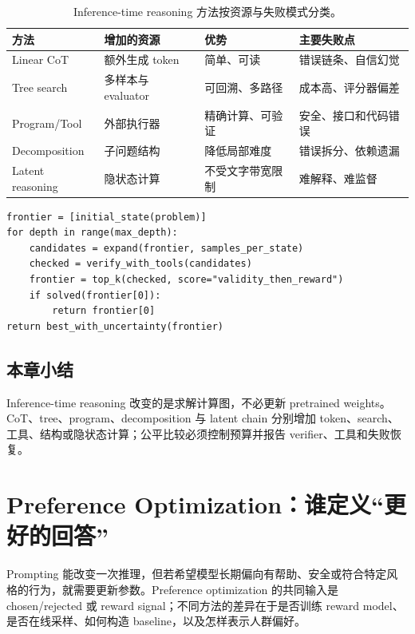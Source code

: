 \documentclass[a4paper]{article}
\begin{document}
\begin{table}[H]
\centering
\small
\begin{tabularx}{\textwidth}{L{0.18\textwidth} X X X}
\toprule
方法 & 增加的资源 & 优势 & 主要失败点 \\
\midrule
Linear CoT & 额外生成 token & 简单、可读 & 错误链条、自信幻觉 \\
Tree search & 多样本与 evaluator & 可回溯、多路径 & 成本高、评分器偏差 \\
Program/Tool & 外部执行器 & 精确计算、可验证 & 安全、接口和代码错误 \\
Decomposition & 子问题结构 & 降低局部难度 & 错误拆分、依赖遗漏 \\
Latent reasoning & 隐状态计算 & 不受文字带宽限制 & 难解释、难监督 \\
\bottomrule
\end{tabularx}
\caption{Inference-time reasoning 方法按资源与失败模式分类。}
\end{table}

\begin{lstlisting}[caption={预算受限的 reasoning search 伪代码}]
frontier = [initial_state(problem)]
for depth in range(max_depth):
    candidates = expand(frontier, samples_per_state)
    checked = verify_with_tools(candidates)
    frontier = top_k(checked, score="validity_then_reward")
    if solved(frontier[0]):
        return frontier[0]
return best_with_uncertainty(frontier)
\end{lstlisting}

\subsection{本章小结}

Inference-time reasoning 改变的是求解计算图，不必更新 pretrained weights。CoT、tree、program、decomposition 与 latent chain 分别增加 token、search、工具、结构或隐状态计算；公平比较必须控制预算并报告 verifier、工具和失败恢复。

\section{Preference Optimization：谁定义“更好的回答”}

Prompting 能改变一次推理，但若希望模型长期偏向有帮助、安全或符合特定风格的行为，就需要更新参数。Preference optimization 的共同输入是 chosen/rejected 或 reward signal；不同方法的差异在于是否训练 reward model、是否在线采样、如何构造 baseline，以及怎样表示人群偏好。
\end{document}
